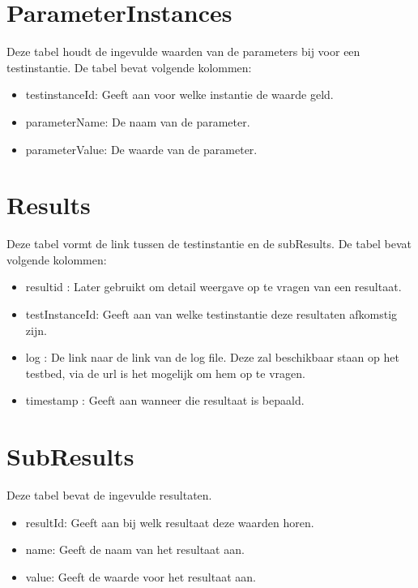 \section{ParameterInstances}
Deze tabel houdt de ingevulde waarden van de parameters bij voor een testinstantie.
De tabel bevat volgende kolommen:
\begin{itemize}
\item testinstanceId: Geeft aan voor welke instantie de waarde geld.
\item parameterName: De naam van de parameter.
\item parameterValue: De waarde van de parameter.
\end{itemize}

\section{Results}
Deze tabel vormt de link tussen de testinstantie en de subResults.
De tabel bevat volgende kolommen:
\begin{itemize}
\item resultid : Later gebruikt om detail weergave op te vragen van een resultaat.
\item testInstanceId: Geeft aan van welke testinstantie deze resultaten afkomstig zijn.
\item log : De link naar de link van de log file. Deze zal beschikbaar staan op het testbed, via de url is het mogelijk om hem op te vragen.
\item timestamp : Geeft aan wanneer die resultaat is bepaald.
\end{itemize}
\section{SubResults}
Deze tabel bevat de ingevulde resultaten.
\begin{itemize}
\item resultId: Geeft aan bij welk resultaat deze waarden horen.
\item name: Geeft de naam van het resultaat aan.
\item value: Geeft de waarde voor het resultaat aan.
\end{itemize}